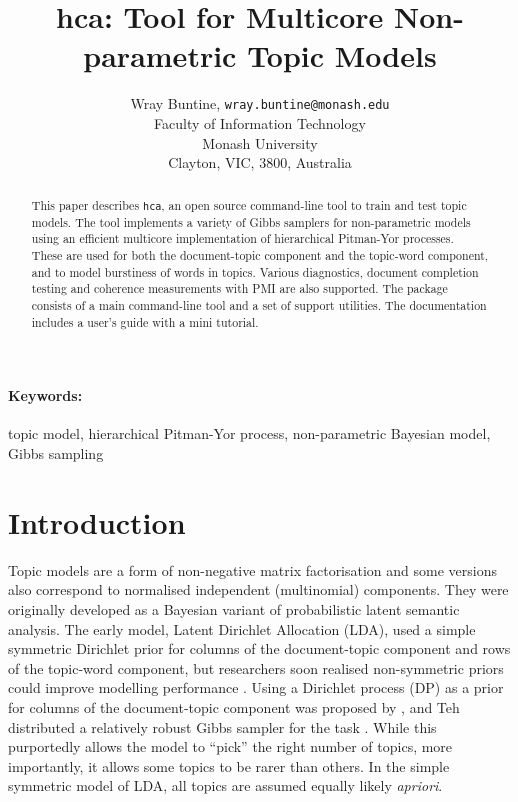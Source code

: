 \documentclass[twoside,11pt]{article}
\begin{document}
\title{hca: Tool for Multicore Non-parametric Topic Models}

\author{Wray Buntine, {\tt wray.buntine@monash.edu} \\
       Faculty of Information Technology \\
       Monash University\\
       Clayton, VIC, 3800, Australia}

\maketitle

\begin{abstract}%
This paper describes {\tt hca}, an open source command-line tool to
train and test topic models.  The tool implements a variety of Gibbs
samplers for non-parametric models using an efficient multicore
implementation
of hierarchical Pitman-Yor processes.  These are used for both the
document-topic component and the topic-word component, and to model
burstiness of words in topics.  Various diagnostics, document
completion testing and coherence measurements with PMI are also
supported.  The package consists of a main command-line tool
and a set of support utilities. The documentation includes a user's
guide with a mini tutorial.
\end{abstract}

\paragraph{Keywords:}
  topic model, hierarchical Pitman-Yor process, non-parametric Bayesian model,
  Gibbs sampling

\section{Introduction}
Topic models are a form of non-negative matrix factorisation
and some versions also correspond to normalised independent
(multinomial) components.
They were originally developed
as a Bayesian variant of probabilistic latent semantic analysis.
The early model, Latent Dirichlet Allocation (LDA),
used a simple symmetric Dirichlet prior for columns of the
document-topic component and rows of the topic-word component, but
researchers soon realised non-symmetric priors could
improve modelling performance \cite{wallach2009rethinking}.
Using a Dirichlet process (DP) as a prior
for columns of the document-topic component was proposed by
\cite{TehJorBea2006}, and Teh distributed a relatively robust Gibbs
sampler for the task \cite{TehNBMM21}.  While this
purportedly allows the
model to ``pick'' the right number of topics, more importantly,
it allows some topics to be rarer than others.
In the simple symmetric model of LDA,
all topics are assumed equally likely {\it apriori}.
\end{document}
